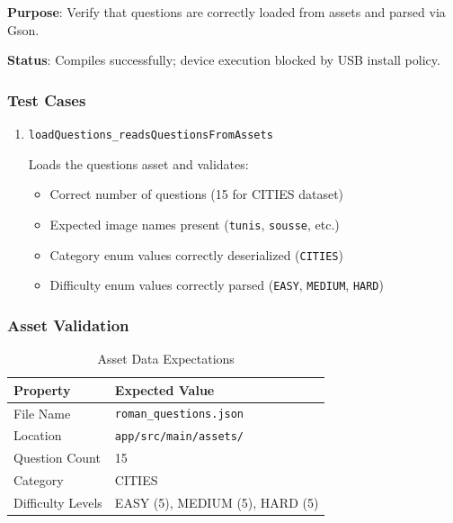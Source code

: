 \documentclass[12pt,a4paper]{article}
\begin{document}
\textbf{Purpose}: Verify that questions are correctly loaded from assets and parsed via Gson.

\textbf{Status}: Compiles successfully; device execution blocked by USB install policy.

\subsubsection{Test Cases}

\begin{enumerate}
    \item \texttt{loadQuestions\_readsQuestionsFromAssets}
    
    Loads the questions asset and validates:
    \begin{itemize}
        \item Correct number of questions (15 for CITIES dataset)
        \item Expected image names present (\texttt{tunis}, \texttt{sousse}, etc.)
        \item Category enum values correctly deserialized (\texttt{CITIES})
        \item Difficulty enum values correctly parsed (\texttt{EASY}, \texttt{MEDIUM}, \texttt{HARD})
    \end{itemize}
\end{enumerate}

\subsubsection{Asset Validation}

\begin{table}[H]
    \centering
    \caption{Asset Data Expectations}
    \begin{tabular}{|l|l|}
        \hline
        \textbf{Property} & \textbf{Expected Value} \\
        \hline
        File Name & \texttt{roman\_questions.json} \\
        \hline
        Location & \texttt{app/src/main/assets/} \\
        \hline
        Question Count & 15 \\
        \hline
        Category & CITIES \\
        \hline
        Difficulty Levels & EASY (5), MEDIUM (5), HARD (5) \\
        \hline
    \end{tabular}
\end{table}
\end{document}
